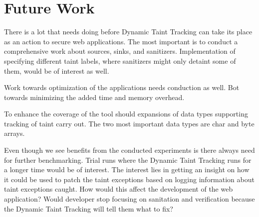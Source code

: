 \chapter{Future Work}
There is a lot that needs doing before Dynamic Taint Tracking can take its place as an action to secure web applications. The most important is to conduct a comprehensive work about sources, sinks, and sanitizers. Implementation of specifying different taint labels, where sanitizers might only detaint some of them, would be of interest as well.

Work towards optimization of the applications needs conduction as well. Bot towards minimizing the added time and memory overhead.

To enhance the coverage of the tool should expansions of data types supporting tracking of taint carry out. The two most important data types are char and byte arrays. 

Even though we see benefits from the conducted experiments is there always need for further benchmarking. Trial runs where the Dynamic Taint Tracking runs for a longer time would be of interest. The interest lies in getting an insight on how it could be used to patch the taint exceptions based on logging information about taint exceptions caught. How would this affect the development of the web application? Would developer stop focusing on sanitation and verification because the Dynamic Taint Tracking will tell them what to fix?